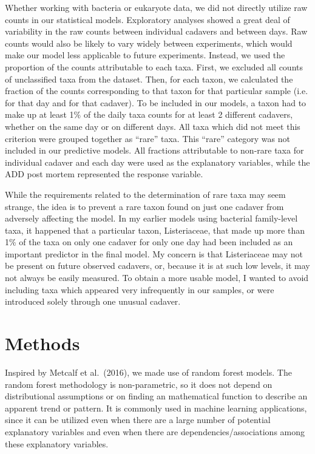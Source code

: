 \documentclass{article}
\begin{document}
Whether working with bacteria or eukaryote data, we did not directly
utilize raw counts in our statistical models.  Exploratory analyses
showed a great deal of variability in the raw counts between
individual cadavers and between days.  Raw counts would also be likely
to vary widely between experiments, which would make our model less
applicable to future experiments.  Instead, we used the proportion of
the counts attributable to each taxa.  First, we excluded all counts
of unclassified taxa from the dataset.  Then, for each taxon, we
calculated the fraction of the counts corresponding to that taxon for
that particular sample (i.e. for that day and for that cadaver).  To
be included in our models, a taxon had to make up at least 1\% of the
daily taxa counts for at least 2 different cadavers, whether on the
same day or on different days.  All taxa which did not meet this
criterion were grouped together as ``rare'' taxa.  This ``rare''
category was not included in our predictive models.  All fractions
attributable to non-rare taxa for individual cadaver and each day were
used as the explanatory variables, while the ADD post mortem
represented the response variable.

While the requirements related to the determination of rare taxa may
seem strange, the idea is to prevent a rare taxon found on just one
cadaver from adversely affecting the model.  In my earlier models
using bacterial family-level taxa, it happened that a particular
taxon, Listeriaceae, that made up more than 1\% of the taxa on only
one cadaver for only one day had been included as an important
predictor in the final model.  My concern is that Listeriaceae may not
be present on future observed cadavers, or, because it is at such low
levels, it may not always be easily measured.  To obtain a more usable
model, I wanted to avoid including taxa which appeared very
infrequently in our samples, or were introduced solely through one
unusual cadaver.


\section{Methods}

Inspired by Metcalf et al.~(2016), we made use of random forest
models.  The random forest methodology is non-parametric, so it does
not depend on distributional assumptions or on finding an mathematical
function to describe an apparent trend or pattern.  It is commonly
used in machine learning applications, since it can be utilized even
when there are a large number of potential explanatory variables and
even when there are dependencies/associations among these explanatory
variables.
\end{document}
